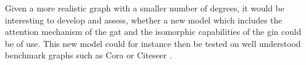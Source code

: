   \noindent Given a more realistic graph with a smaller number of degrees, it
  would be interesting to develop and assess, whether a new model which
  includes the attention mechanism of the \acs{gat} and the isomorphic 
  capabilities of the \acs{gin} could be of use. This new model could for
  instance then be tested on well understood benchmark graphs such as Cora
  \citep{mccallum2000automating} or Citeseer \citep{giles1998citeseer}. 

